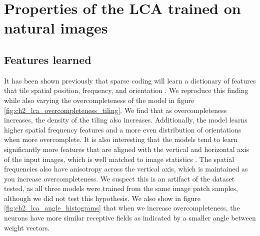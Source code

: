 \section{Properties of the LCA trained on natural images}\label{sec:ch2_lca_properties}
\subsection{Features learned}
It has been shown previously that sparse coding will learn a dictionary of features that tile spatial position, frequency, and orientation \parencite{olshausen1996emergence, olshausen1997sparse}. We reproduce this finding while also varying the overcompleteness of the model in figure \ref{fig:ch2_lca_overcompleteness_tiling}. We find that as overcompleteness increases, the density of the tiling also increases. Additionally, the model learns higher spatial frequency features and a more even distribution of orientations when more overcomplete. It is also interesting that the models tend to learn significantly more features that are aligned with the vertical and horizontal axis of the input images, which is well matched to image statistics \parencite{switkes1978spatial, torralba2003statistics}. The spatial frequencies also have anisotropy across the vertical axis, which is maintained as you increase overcompleteness. We suspect this is an artifact of the dataset tested, as all three models were trained from the same image patch samples, although we did not test this hypothesis. We also show in figure \ref{fig:ch2_lca_angle_histograms} that when we increase overcompleteness, the neurons have more similar receptive fields as indicated by a smaller angle between weight vectors.

